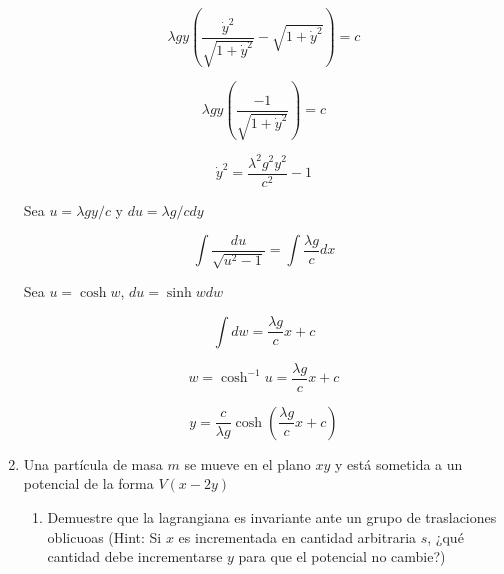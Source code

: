 \documentclass[12pt,a4paper]{article}
\begin{document}
\begin{enumerate}
        \begin{equation*}
            \lambda g y\left(\frac{\dot{y}^2}{\sqrt{1 + \dot{y}^2}} -  \sqrt{1 + \dot{y}^2}\right) = c
        \end{equation*}
        
         \begin{equation*}
             \lambda g y \left(\frac{-1}{\sqrt{1+ \dot{y}^2}} \right) = c
         \end{equation*}
         
         \begin{equation*}
             \dot{y}^2 = \frac{\lambda^2 g^2 y^2}{c^2} - 1
         \end{equation*}
         
         Sea $u = \lambda g y /c$ y $du = \lambda g/c dy$
         
         \begin{equation*}
              \int \frac{du}{\sqrt{u^2 - 1}} = \int \frac{\lambda g}{c} dx
         \end{equation*}
         
         Sea $u = \cosh{w}$, $du = \sinh{w} dw$
         
         \begin{equation*}
             \int dw = \frac{\lambda g}{c} x + c
         \end{equation*}
         
         \begin{equation*}
             w = \cosh^{-1}{u} = \frac{\lambda g}{c} x + c
         \end{equation*}
         
         \begin{equation*}
             y = \frac{c}{\lambda g} \cosh{(\frac{\lambda g}{c} x + c)}
         \end{equation*}
        
        
        
        
        
        
        
        
        \item Una partícula de masa $m$ se mueve en el plano $xy$ y está sometida a un potencial de la forma $V(x-2y)$
        
        \begin{enumerate}
            \item Demuestre que la lagrangiana es invariante ante un grupo de traslaciones oblicuoas (Hint: Si $x$ es incrementada en cantidad arbitraria $s$, ¿qué cantidad debe incrementarse $y$ para que el potencial no cambie?)
            

\end{enumerate}
\end{enumerate}
\end{document}
